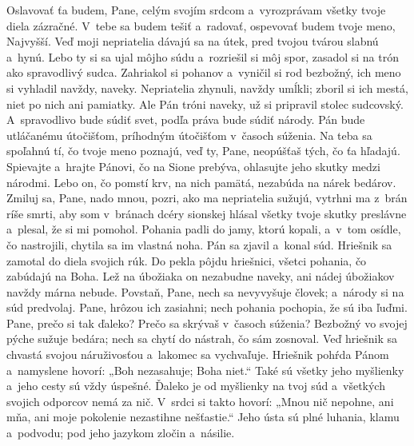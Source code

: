 Oslavovať ťa budem, Pane, celým svojím srdcom
a~vyrozprávam všetky tvoje diela zázračné.
\versseparator
V~tebe sa budem tešiť a~radovať,
ospevovať budem tvoje meno, Najvyšší.
\versseparator
Veď moji nepriatelia dávajú sa na útek,
pred tvojou tvárou slabnú a~hynú.
\versseparator
Lebo ty si sa ujal môjho súdu a~rozriešil si môj spor,
zasadol si na trón ako spravodlivý sudca.
\versseparator
Zahriakol si pohanov a~vyničil si rod bezbožný,
ich meno si vyhladil navždy, naveky.
\versseparator
Nepriatelia zhynuli, navždy umĺkli;
zboril si ich mestá, niet po nich ani pamiatky.
\versseparator
Ale Pán tróni naveky,
už si pripravil stolec sudcovský.
\versseparator
A~spravodlivo bude súdiť svet,
podľa práva bude súdiť národy.
\versseparator
Pán bude utláčanému útočišťom,
príhodným útočišťom v~časoch súženia.
\versseparator
Na teba sa spoľahnú tí, čo tvoje meno poznajú,
veď ty, Pane, neopúšťaš tých, čo ťa hľadajú.
\versseparator
Spievajte a~hrajte Pánovi, čo na Sione prebýva,
ohlasujte jeho skutky medzi národmi.
\versseparator
Lebo on, čo pomstí krv, na nich pamätá,
nezabúda na nárek bedárov.
\versseparator
Zmiluj sa, Pane, nado mnou,
pozri, ako ma nepriatelia sužujú,
\versseparator
vytrhni ma z~brán ríše smrti,
aby som v~bránach dcéry sionskej hlásal všetky tvoje skutky preslávne
\versseparator
a~plesal, že si mi pomohol.
Pohania padli do jamy, ktorú kopali,
\versseparator
a~v~tom osídle, čo nastrojili,
chytila sa im vlastná noha.
\versseparator
Pán sa zjavil a~konal súd.
Hriešnik sa zamotal do diela svojich rúk.
\versseparator
Do pekla pôjdu hriešnici,
všetci pohania, čo zabúdajú na Boha.
\versseparator
Lež na úbožiaka on nezabudne naveky,
ani nádej úbožiakov navždy márna nebude.
\versseparator
Povstaň, Pane, nech sa nevyvyšuje človek;
a~národy si na súd predvolaj.
\versseparator
Pane, hrôzou ich zasiahni;
nech pohania pochopia, že sú iba ľuďmi. 
\versseparator
Pane, prečo si tak ďaleko?
Prečo sa skrývaš v~časoch súženia?
\versseparator
Bezbožný vo svojej pýche sužuje bedára;
nech sa chytí do nástrah, čo sám zosnoval.
\versseparator
Veď hriešnik sa chvastá svojou náruživosťou
a~lakomec sa vychvaľuje.
\versseparator
Hriešnik pohŕda Pánom a~namyslene hovorí:
\versseparator
„Boh nezasahuje; Boha niet.“
Také sú všetky jeho myšlienky
a~jeho cesty sú vždy úspešné.
\versseparator
Ďaleko je od myšlienky na tvoj súd
a~všetkých svojich odporcov nemá za nič.
\versseparator
V~srdci si takto hovorí: „Mnou nič nepohne,
ani mňa, ani moje pokolenie nezastihne nešťastie.“
\versseparator
Jeho ústa sú plné luhania, klamu a~podvodu;
pod jeho jazykom zločin a~násilie.
\versseparator
